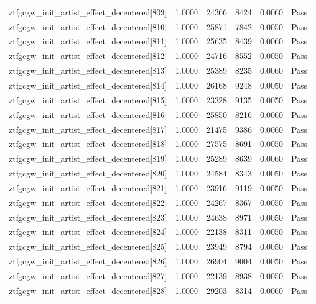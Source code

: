 \begin{table}[htbp]
\begin{tabular}{llrrll}
ztfgcgw\_init\_artist\_effect\_decentered[809] & 1.0000 & 24366 & 8424 & 0.0060 & Pass \\
ztfgcgw\_init\_artist\_effect\_decentered[810] & 1.0000 & 25871 & 7842 & 0.0050 & Pass \\
ztfgcgw\_init\_artist\_effect\_decentered[811] & 1.0000 & 25635 & 8439 & 0.0060 & Pass \\
ztfgcgw\_init\_artist\_effect\_decentered[812] & 1.0000 & 24716 & 8552 & 0.0050 & Pass \\
ztfgcgw\_init\_artist\_effect\_decentered[813] & 1.0000 & 25389 & 8235 & 0.0060 & Pass \\
ztfgcgw\_init\_artist\_effect\_decentered[814] & 1.0000 & 26168 & 9248 & 0.0050 & Pass \\
ztfgcgw\_init\_artist\_effect\_decentered[815] & 1.0000 & 23328 & 9135 & 0.0050 & Pass \\
ztfgcgw\_init\_artist\_effect\_decentered[816] & 1.0000 & 25850 & 8216 & 0.0060 & Pass \\
ztfgcgw\_init\_artist\_effect\_decentered[817] & 1.0000 & 21475 & 9386 & 0.0060 & Pass \\
ztfgcgw\_init\_artist\_effect\_decentered[818] & 1.0000 & 27575 & 8691 & 0.0050 & Pass \\
ztfgcgw\_init\_artist\_effect\_decentered[819] & 1.0000 & 25289 & 8639 & 0.0060 & Pass \\
ztfgcgw\_init\_artist\_effect\_decentered[820] & 1.0000 & 24584 & 8343 & 0.0050 & Pass \\
ztfgcgw\_init\_artist\_effect\_decentered[821] & 1.0000 & 23916 & 9119 & 0.0050 & Pass \\
ztfgcgw\_init\_artist\_effect\_decentered[822] & 1.0000 & 24267 & 8367 & 0.0050 & Pass \\
ztfgcgw\_init\_artist\_effect\_decentered[823] & 1.0000 & 24638 & 8971 & 0.0050 & Pass \\
ztfgcgw\_init\_artist\_effect\_decentered[824] & 1.0000 & 22138 & 8311 & 0.0050 & Pass \\
ztfgcgw\_init\_artist\_effect\_decentered[825] & 1.0000 & 23949 & 8794 & 0.0050 & Pass \\
ztfgcgw\_init\_artist\_effect\_decentered[826] & 1.0000 & 26904 & 9004 & 0.0050 & Pass \\
ztfgcgw\_init\_artist\_effect\_decentered[827] & 1.0000 & 22139 & 8938 & 0.0050 & Pass \\
ztfgcgw\_init\_artist\_effect\_decentered[828] & 1.0000 & 29203 & 8314 & 0.0060 & Pass \\

\end{tabular}
\end{table}
